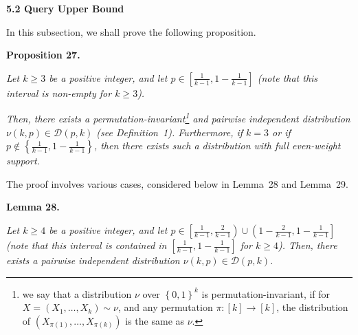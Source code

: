 \documentclass[10pt,a4paper]{article}
\begin{document}





\par\medskip\noindent\textbf{
5.2 Query Upper Bound}\par




In this subsection, we shall prove the following proposition.\par





\par\medskip\noindent\textbf{
\textbf{Proposition 27}\textbf{.}
}\par



\emph{Let $k\geqslant 3$ be a positive integer, and let $p\in\left[\frac{1}{k-1},1-\frac{1}{k-1}\right]$ (note that this interval is non-empty for $k\geqslant 3$).}\par




\emph{Then, there exists a permutation-invariant\footnote{we say that a distribution $\nu$ over $\left\{0,1\right\}^{k}$ is permutation-invariant, if for $X=(X_{1},\dots,X_{k})\sim\nu$, and any permutation $\pi:[k]\to[k]$, the distribution of $\left(X_{\pi(1)},\dots,X_{\pi(k)}\right)$ is the same as $\nu$.} and pairwise independent distribution $\nu(k,p)\in\mathcal{D}(p,k)$ (see Definition 1).
Furthermore, if $k=3$ or if $p\not\in\left\{\frac{1}{k-1},1-\frac{1}{k-1}\right\}$, then there exists such a distribution with full even-weight support.}\par






The proof involves various cases, considered below in Lemma 28 and Lemma 29.\par





\par\medskip\noindent\textbf{
\textbf{Lemma 28}\textbf{.}
}\par



\emph{Let $k\geqslant 4$ be a positive integer, and let $p\in\left[\frac{1}{k-1},\frac{2}{k-1}\right)\cup\left(1-\frac{2}{k-1},1-\frac{1}{k-1}\right]$ (note that this interval is contained in $\left[\frac{1}{k-1},1-\frac{1}{k-1}\right]$ for $k\geqslant 4$).
Then, there exists a pairwise independent distribution $\nu(k,p)\in\mathcal{D}(p,k)$.}\par
\end{document}
